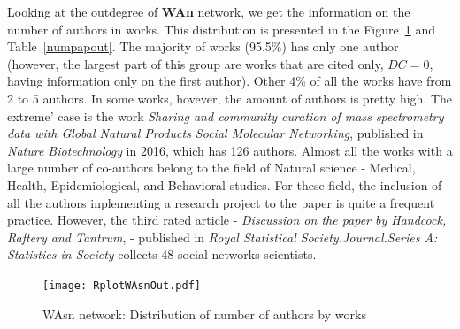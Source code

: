 \documentclass[11pt]{article} %
\newcommand{\Remark}[1]{\ifodd\value{page} \normalmarginpar
 \else \reversemarginpar \fi \marginpar{{\footnotesize #1}} }
\begin{document}
Looking at the outdegree of \textbf{WAn} network, we get the information on the number of authors in works. This distribution is presented in the Figure~\ref{authworks} and Table~\ref{numpapout}. The majority of works (95.5\%) has only one author (however, the largest part of this group are works that are cited only, $DC=0$, having information only on the first author). Other 4\% of all the works have from 2 to 5 authors. In some works, hovever, the amount of authors is pretty high. The extreme' case is the work \textit{Sharing and community curation of mass spectrometry data with Global Natural Products Social Molecular Networking}, published in \textit{Nature Biotechnology} in 2016, which has 126 authors. Almost all the works with a large number of co-authors belong to the field of Natural science - Medical, Health, Epidemiological, and Behavioral studies. For these field, the inclusion of all the authors inplementing a research project to the paper is quite a frequent practice. However, the third rated article - \textit{Discussion on the paper by Handcock, Raftery and Tantrum}, - published in \textit{Royal Statistical Society.Journal.Series A: Statistics in Society} collects 48 social networks scientists. \Remark{remove Table 6?}\medskip

\begin{figure}
\centerline{\texttt{[image: RplotWAsnOut.pdf]}}
\caption{WAsn network: Distribution of number of authors by works}\label{authworks}
\end{figure}
\medskip   
\end{document}
